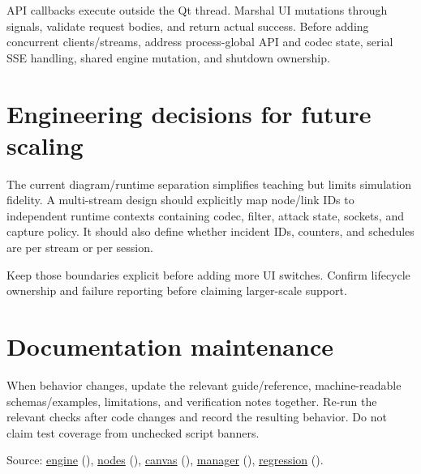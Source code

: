 API callbacks execute outside the Qt thread. Marshal UI mutations through signals, validate request bodies, and return actual success. Before adding concurrent clients/streams, address process-global API and codec state, serial SSE handling, shared engine mutation, and shutdown ownership.

\section*{Engineering decisions for future scaling}
The current diagram/runtime separation simplifies teaching but limits simulation fidelity. A multi-stream design should explicitly map node/link IDs to independent runtime contexts containing codec, filter, attack state, sockets, and capture policy. It should also define whether incident IDs, counters, and schedules are per stream or per session.

Keep those boundaries explicit before adding more UI switches. Confirm lifecycle ownership and failure reporting before claiming larger-scale support.

\section*{Documentation maintenance}
\par\noindent\begin{minipage}{\linewidth}\setlength{\parskip}{5pt}
When behavior changes, update the relevant guide/reference, machine-readable schemas/examples, limitations, and verification notes together. Re-run the relevant checks after code changes and record the resulting behavior. Do not claim test coverage from unchecked script banners.
{\footnotesize\color{muted}\raggedright Source: \href{https://github.com/neerajjayesh/GridSec-project/blob/main/core/attack_engine.py}{engine} (), \href{https://github.com/neerajjayesh/GridSec-project/blob/main/gui/node_types.py}{nodes} (), \href{https://github.com/neerajjayesh/GridSec-project/blob/main/gui/canvas.py}{canvas} (), \href{https://github.com/neerajjayesh/GridSec-project/blob/main/core/integration_manager.py}{manager} (), \href{https://github.com/neerajjayesh/GridSec-project/blob/main/test_regression.py}{regression} ().\par}
\end{minipage}\par

